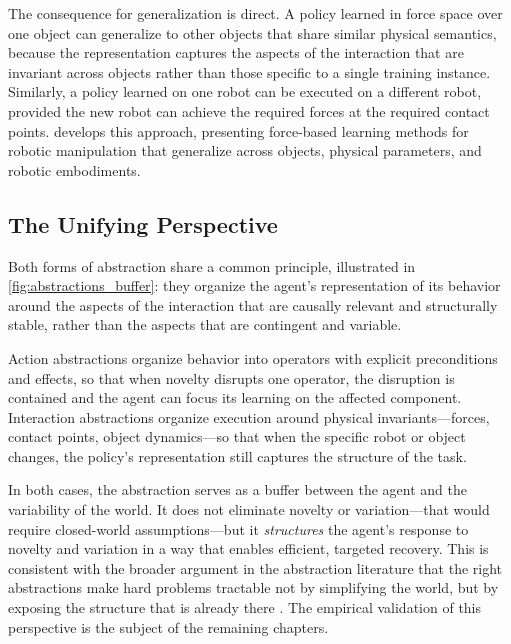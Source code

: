 The consequence for generalization is direct. A policy learned in force space over one object can generalize to other objects that share similar physical semantics, because the representation captures the aspects of the interaction that are invariant across objects rather than those specific to a single training instance. Similarly, a policy learned on one robot can be executed on a different robot, provided the new robot can achieve the required forces at the required contact points.  develops this approach, presenting force-based learning methods for robotic manipulation that generalize across objects, physical parameters, and robotic embodiments.



\subsection{The Unifying Perspective}
\label{sec:unifying_perspective}

Both forms of abstraction share a common principle, illustrated in \cref{fig:abstractions_buffer}: they organize the agent's representation of its behavior around the aspects of the interaction that are causally relevant and structurally stable, rather than the aspects that are contingent and variable.

Action abstractions organize behavior into operators with explicit preconditions and effects, so that when novelty disrupts one operator, the disruption is contained and the agent can focus its learning on the affected component. Interaction abstractions organize execution around physical invariants---forces, contact points, object dynamics---so that when the specific robot or object changes, the policy's representation still captures the structure of the task.

In both cases, the abstraction serves as a buffer between the agent and the variability of the world. It does not eliminate novelty or variation---that would require closed-world assumptions---but it \emph{structures} the agent's response to novelty and variation in a way that enables efficient, targeted recovery. This is consistent with the broader argument in the abstraction literature that the right abstractions make hard problems tractable not by simplifying the world, but by exposing the structure that is already there \citep{konidaris2019necessity, abel2020theory}. The empirical validation of this perspective is the subject of the remaining chapters.